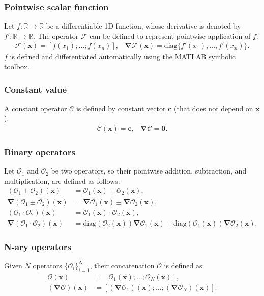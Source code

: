 \documentclass[MSc,beforeExam]{iitcsthesis}
\newcommand{\diag}{\ensuremath{\mathrm{diag}}}
\newcommand{\R}{\ensuremath{\mathbb{R}}}
\newcommand\bnabla{\boldsymbol{\nabla}}
\newcommand\bx{\boldsymbol{x}}
\newcommand\bc{\boldsymbol{c}}
\newcommand\bzero{\boldsymbol{0}}
\newcommand\cF{\mathcal{F}}
\newcommand\cO{\mathcal{O}}
\begin{document}
\subsubsection{Pointwise scalar function}
Let $f: \R \rightarrow \R$ be a differentiable 1D function, whose derivative is
denoted by $f': \R \rightarrow \R$. The operator $\cF$ can be defined to
represent pointwise application of $f$:
\begin{equation}\begin{array}{cc}
\cF(\bx) = [f(x_1); \ldots; f(x_n)], &
\bnabla\cF(\bx) = \diag\{f'(x_1), \ldots, f'(x_n)\}.
\end{array}\end{equation}
$f$ is defined and differentiated automatically using the MATLAB symbolic toolbox.

\subsubsection{Constant value}
A constant operator $\mathcal{C}$ is defined by constant vector $\bc$ 
(that does not depend on $\bx$):
\begin{equation}\begin{array}{cc}
\mathcal{C}(\bx) = \bc, &
\bnabla\mathcal{C} = \bzero.
\end{array}\end{equation}

\subsubsection{Binary operators}
Let $\cO_1$ and $\cO_2$ be two operators, so their pointwise addition, subtraction,
and multiplication, are defined as follows:
\begin{align}
(\cO_1 \pm \cO_2)(\bx) &= \cO_1(\bx) \pm \cO_2(\bx), \\
\nonumber
\bnabla (\cO_1 \pm \cO_2)(\bx) &= \bnabla\cO_1(\bx) \pm \bnabla\cO_2(\bx), \\
(\cO_1 \cdot \cO_2)(\bx) &= \cO_1(\bx) \cdot \cO_2(\bx), \\
\nonumber
\bnabla (\cO_1 \cdot \cO_2)(\bx) &= \diag(\cO_2(\bx)) \bnabla\cO_1(\bx) 
                                  + \diag(\cO_1(\bx)) \bnabla\cO_2(\bx).
\end{align}
\subsubsection{N-ary operators}
Given $N$ operators $\{\cO_i\}_{i=1}^N$, their concatenation $\cO$ is defined as:
\begin{align}
\cO(\bx) &= [\cO_1(\bx); \ldots; \cO_N(\bx)], \\
\nonumber
(\bnabla\cO)(\bx) &= [(\bnabla\cO_1)(\bx); \ldots; (\bnabla\cO_N)(\bx)].
\end{align}
\end{document}

